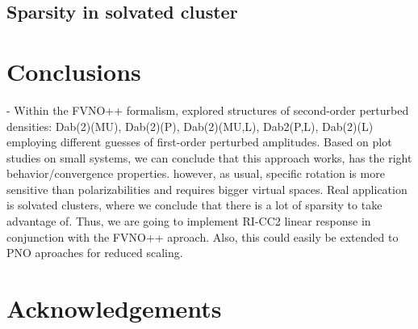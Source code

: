 \subsection{Sparsity in solvated cluster}
\section{Conclusions}

- Within the FVNO++ formalism, explored 
structures of second-order perturbed densities:
Dab(2)(MU), Dab(2)(P), Dab(2)(MU,L), Dab2(P,L), Dab(2)(L) 
employing different guesses of first-order perturbed amplitudes.  
Based on plot studies on small systems, we can conclude that 
this approach works, has the right behavior/convergence properties.
however, as usual, specific rotation is more sensitive than
polarizabilities and requires bigger virtual spaces.
Real application is solvated clusters, where we conclude that
there is a lot of sparsity to take advantage of.
Thus, we are going to implement RI-CC2 linear response
in conjunction with the FVNO++ aproach.
Also, this could easily be extended to PNO aproaches for reduced scaling.

\section{Acknowledgements}

